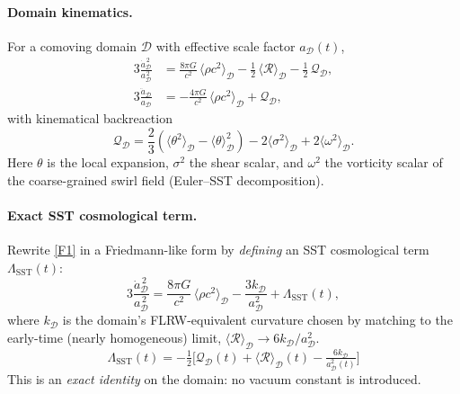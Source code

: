 \documentclass[10pt,reprint,aps,onecolumn,nofootinbib]{revtex4-2}
\begin{document}
\paragraph{Domain kinematics.}
    For a comoving domain $\mathcal{D}$ with effective scale factor $a_\mathcal{D}(t)$,
    \begin{align}
        3\frac{\dot a_\mathcal{D}^{\,2}}{a_\mathcal{D}^{\,2}}
        &= \frac{8\pi G}{c^2}\,\langle \rho c^2 \rangle_\mathcal{D}
        - \tfrac{1}{2}\,\langle \mathcal{R} \rangle_\mathcal{D}
        - \tfrac{1}{2}\,\mathcal{Q}_\mathcal{D}, \tag{F1}\label{F1}\\
        3\frac{\ddot a_\mathcal{D}}{a_\mathcal{D}}
        &= -\frac{4\pi G}{c^2}\,\langle \rho c^2 \rangle_\mathcal{D}
        + \mathcal{Q}_\mathcal{D}, \tag{F2}\label{F2}
    \end{align}
    with kinematical backreaction
    \[
        \mathcal{Q}_\mathcal{D}
        = \frac{2}{3}\!\left(\langle \theta^{2}\rangle_\mathcal{D}-\langle \theta\rangle_\mathcal{D}^{2}\right)
        - 2\langle \sigma^{2}\rangle_\mathcal{D}
        + 2\langle \omega^{2}\rangle_\mathcal{D}.
    \]
    Here $\theta$ is the local expansion, $\sigma^2$ the shear scalar, and $\omega^2$ the vorticity scalar of the coarse-grained swirl field (Euler–SST decomposition).

\paragraph{Exact SST cosmological term.}
    Rewrite \eqref{F1} in a Friedmann-like form by \emph{defining} an SST cosmological term $\Lambda_{\!\mathrm{SST}}(t)$:
    \[
        3\frac{\dot a_\mathcal{D}^{\,2}}{a_\mathcal{D}^{\,2}}
        = \frac{8\pi G}{c^2}\,\langle \rho c^2 \rangle_\mathcal{D}
        - \frac{3k_\mathcal{D}}{a_\mathcal{D}^{2}}
        + \Lambda_{\!\mathrm{SST}}(t),
    \]
    where $k_\mathcal{D}$ is the domain’s FLRW-equivalent curvature chosen by matching to the early-time (nearly homogeneous) limit, $\langle \mathcal{R} \rangle_\mathcal{D}\to 6k_\mathcal{D}/a_\mathcal{D}^2$.
    \[
        \boxed{\;
        \Lambda_{\!\mathrm{SST}}(t)
            = -\tfrac{1}{2}\Big[\mathcal{Q}_\mathcal{D}(t)
            +\langle \mathcal{R} \rangle_\mathcal{D}(t)
            - \tfrac{6k_\mathcal{D}}{a_\mathcal{D}^{2}(t)}\Big]
            \;}
        \tag{D1}\label{D1}
    \]
    This is an \emph{exact identity} on the domain: no vacuum constant is introduced.
\end{document}
